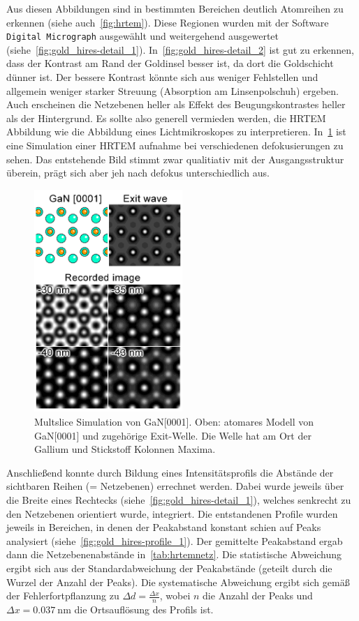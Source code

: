 \documentclass[slug=TEM, room=IFW, supervisor=?, coursedate=23.\ 01.\ 2020]{../../Lab_Report_LaTeX/lab_report}
\begin{document}
Aus diesen Abbildungen sind in bestimmten Bereichen deutlich
Atomreihen zu erkennen (siehe auch~\ref{fig:hrtem}). Diese Regionen
wurden mit der Software \verb|Digital Micrograph| ausgew\"ahlt und
weitergehend ausgewertet
(siehe~\ref{fig:gold_hires-detail_1}). In~\ref{fig:gold_hires-detail_2}
ist gut zu erkennen, dass der Kontrast am Rand der Goldinsel besser
ist, da dort die Goldschicht d\"unner ist. Der bessere Kontrast
k\"onnte sich aus weniger Fehlstellen und allgemein weniger starker
Streuung (Absorption am Linsenpolschuh) ergeben. Auch erscheinen die
Netzebenen heller als Effekt des Beugungskontrastes heller als der
Hintergrund. Es sollte also generell vermieden werden, die HRTEM
Abbildung wie die Abbildung eines Lichtmikroskopes zu
interpretieren. In~\ref{fig:simu} ist eine Simulation einer HRTEM
aufnahme bei verschiedenen defokusierungen zu sehen. Das entstehende
Bild stimmt zwar qualitiativ mit der Ausgangsstruktur \"uberein,
pr\"agt sich aber jeh nach defokus unterschiedlich aus.

\begin{figure}[htp]
  \centering
  \includegraphics[width=0.5\textwidth]{figs/Simulation_GaN.png}
  \caption{Multslice Simulation von GaN[0001]. Oben: atomares Modell von GaN[0001] und zugehörige Exit-Welle. Die Welle hat am Ort der Gallium und Stickstoff Kolonnen Maxima.~\cite{wiki:simu}}\label{fig:simu}
\end{figure}

Anschließend konnte durch Bildung eines Intensitätsprofils die
Abst\"ande der sichtbaren Reihen (= Netzebenen) errechnet
werden. Dabei wurde jeweils \"uber die Breite eines Rechtecks
(siehe~\ref{fig:gold_hires-detail_1}), welches senkrecht zu den
Netzebenen orientiert wurde, integriert. Die entstandenen Profile
wurden jeweils in Bereichen, in denen der Peakabstand konstant schien
auf Peaks analysiert (siehe~\ref{fig:gold_hires-profile_1}). Der
gemittelte Peakabstand ergab dann die Netzebenenabst\"ande
in~\ref{tab:hrtemnetz}. Die statistische Abweichung ergibt sich aus
der Standardabweichung der Peakabst\"ande (geteilt durch die Wurzel
der Anzahl der Peaks). Die systematische Abweichung ergibt sich
gem\"a\ss{} der Fehlerfortpflanzung zu
\(\Delta d = \frac{\Delta x}{n}\), wobei \(n\) die Anzahl der Peaks
und \(\Delta x = \SI{0.037}{\nano\meter}\) die Ortsaufl\"osung des
Profils ist.
\end{document}
